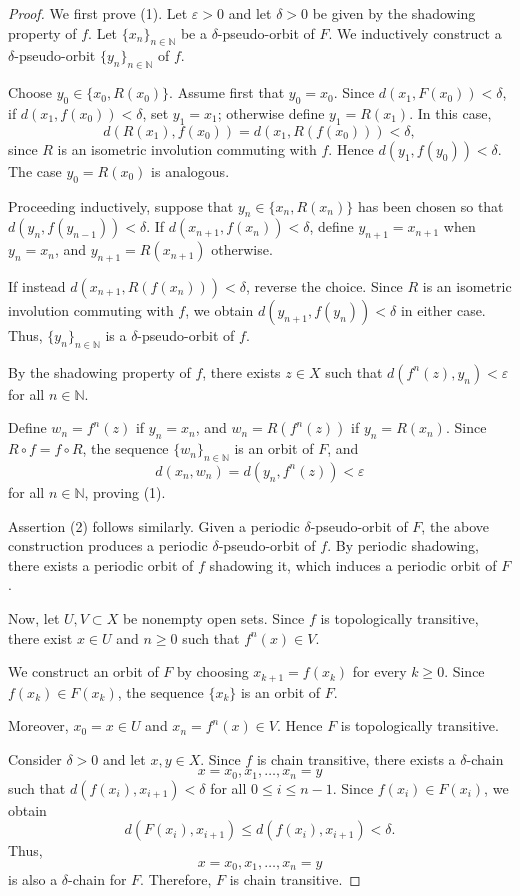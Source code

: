 \documentclass{amsart}
\theoremstyle{definition}
\begin{document}
\begin{proof}

We first prove (1). Let $\varepsilon>0$ and let $\delta>0$ be given by the shadowing property of $f$. Let $
\{x_n\}_{n\in\mathbb N}$ be a $\delta$-pseudo-orbit of $F$. We inductively construct a $\delta$-pseudo-orbit $
\{y_n\}_{n\in\mathbb N}$ of $f$.

Choose $y_0\in\{x_0,R(x_0)\}$. Assume first that $y_0=x_0$. Since $d(x_1,F(x_0))<\delta$, if $d(x_1,f(x_0))<\delta$, set $y_1=x_1$; otherwise define $
y_1=R(x_1)$. In this case,
\[
d(R(x_1),f(x_0))
=
d(x_1,R(f(x_0)))
<
\delta,
\]
since $R$ is an isometric involution commuting with $f$. Hence
$d(y_1,f(y_0))<\delta$. The case $y_0=R(x_0)$ is analogous.

Proceeding inductively, suppose that $y_n\in\{x_n,R(x_n)\}$ has been chosen so that $d(y_n,f(y_{n-1}))<\delta$. If $d(x_{n+1},f(x_n))<\delta$, define
$y_{n+1}=x_{n+1}$ when $y_n=x_n$, and $y_{n+1}=R(x_{n+1})$ otherwise. 

If instead $d(x_{n+1},R(f(x_n)))<\delta$, reverse the choice. Since $R$ is an isometric involution commuting with $f$, we obtain $d(y_{n+1},f(y_n))<\delta$ in either case. Thus, $\{y_n\}_{n\in\mathbb N}$ is a $\delta$-pseudo-orbit of $f$.

By the shadowing property of $f$, there exists $z\in X$ such that $
d(f^n(z),y_n)<\varepsilon$ for all $n\in\mathbb N$. 

Define $w_n=f^n(z)$ if $y_n=x_n$, and $w_n=R(f^n(z))$ if $y_n=R(x_n)$. Since
$R\circ f=f\circ R$, the sequence $\{w_n\}_{n\in\mathbb N}$ is an orbit of $F$, and 
\[
d(x_n,w_n)
=
d(y_n,f^n(z))
<
\varepsilon
\]
for all $n\in\mathbb N$, proving (1).

Assertion (2) follows similarly. Given a periodic $\delta$-pseudo-orbit of $F$, the above construction produces a periodic $\delta$-pseudo-orbit of $f$. By periodic shadowing, there exists a periodic orbit of $f$ shadowing it, which induces a periodic orbit of $F$.

Now, let $U,V\subset X$ be nonempty open sets. Since $f$ is topologically transitive, there exist $x\in U$ and $n\geq 0$ such that $f^n(x)\in V$.

We construct an orbit of $F$ by choosing $x_{k+1}=f(x_k)$ for every $k\geq 0$. Since $f(x_k)\in F(x_k)$, the sequence $\{x_k\}$ is an orbit of $F$.

Moreover, $x_0=x\in U$ and $x_n=f^n(x)\in V$. Hence $F$ is topologically transitive.

Consider $\delta>0$ and let $x,y\in X$. Since $f$ is chain transitive, there exists a $\delta$-chain
\[
x=x_0,x_1,\ldots,x_n=y
\]
such that $d(f(x_i),x_{i+1})<\delta$ for all $0\leq i\leq n-1$. Since $f(x_i)\in F(x_i)$, we obtain
\[
d(F(x_i),x_{i+1})
\leq d(f(x_i),x_{i+1})
<\delta.
\]
Thus,
\[
x=x_0,x_1,\ldots,x_n=y
\]
is also a $\delta$-chain for $F$. Therefore, $F$ is chain transitive.
\end{proof}
\end{document}
